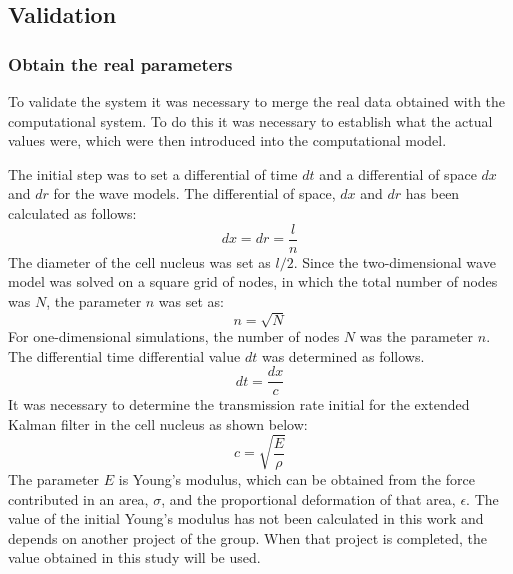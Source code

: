 \documentclass[12pt, a4paper]{article} %
\begin{document}
	\setlength{\parskip}{0mm}
	
	\subsection{Validation}
	
	\subsubsection{Obtain the real parameters}
	
	To validate the system it was necessary to merge the real data obtained with the computational system. To do this it was necessary to establish what the actual values were, which were then introduced into the computational model.
	
	\setlength{\parskip}{4mm}
	
	The initial step was to set a differential of time $dt$ and a differential of space $dx$ and $dr$ for the wave models. The differential of space, $dx$ and $dr$ has been calculated as follows:
	\begin{equation} \label{eqn:dx}
		dx = dr = \frac{l}{n}
	\end{equation}
	The diameter of the cell nucleus was set as $l/2$. Since the two-dimensional wave model was solved on a square grid of nodes, in which the total number of nodes was $N$, the parameter $n$ was set as:
	\begin{equation} \label{eqn:n}
		n = \sqrt{N}
	\end{equation}
	For one-dimensional simulations, the number of nodes $N$ was the parameter $n$. The differential time differential value $dt$ was determined as follows.
	\begin{equation} \label{eqn:dt}
		dt = \frac{dx}{c}
	\end{equation}
	It was necessary to determine the transmission rate initial for the extended Kalman filter in the cell nucleus as shown below:
	\begin{equation} \label{eqn:c}
		c = \sqrt{\frac{E}{\rho}}
	\end{equation}
	The parameter $E$ is Young's modulus, which can be obtained from the force contributed in an area, $\sigma$, and the proportional deformation of that area, $\epsilon$. The value of the initial Young's modulus has not been calculated in this work and depends on another project of the group. When that project is completed, the value obtained in this study will be used.
	
\end{document}
